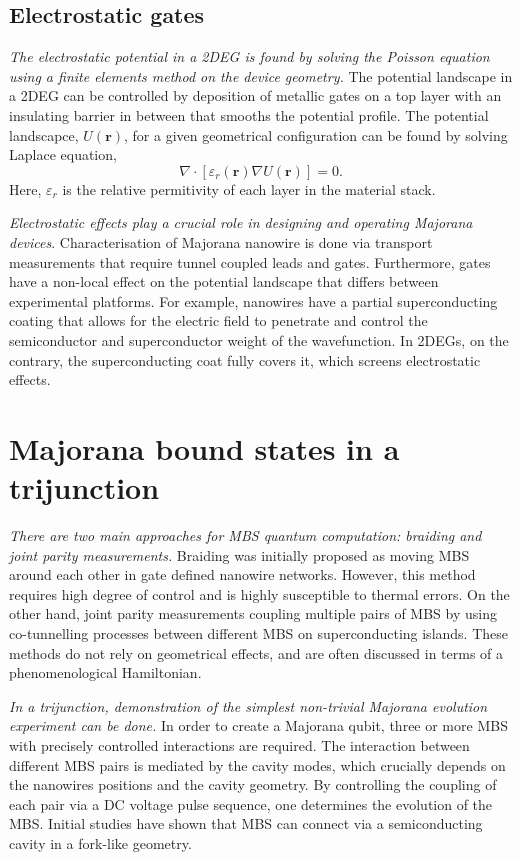 \subsection{Electrostatic gates}

\textit{The electrostatic potential in a 2DEG is found by solving the Poisson equation using a finite elements method on the device geometry.}
The potential landscape in a 2DEG can be controlled by deposition of metallic gates on a top layer with an insulating barrier in between that smooths the potential profile.
The potential landscapce, $U(\mathbf{r})$, for a given geometrical configuration can be found by solving Laplace equation, 
\begin{equation}
\nabla \cdot \left[ \varepsilon_r(\mathbf{r}) \nabla U(\mathbf{r}) \right] = 0.
\end{equation}
Here, $\varepsilon_r$ is the relative permitivity of each layer in the material stack.

\textit{Electrostatic effects play a crucial role in designing and operating Majorana devices}.
Characterisation of Majorana nanowire is done via transport measurements that require tunnel coupled leads and gates.
Furthermore, gates have a non-local effect on the potential landscape that differs between experimental platforms.
For example, nanowires have a partial superconducting coating that allows for the electric field to penetrate and control the semiconductor and superconductor weight of the wavefunction.
In 2DEGs, on the contrary, the superconducting coat fully covers it, which screens electrostatic effects.

\section{Majorana bound states in a trijunction}

\textit{There are two main approaches for MBS quantum computation: braiding and joint parity measurements.}
Braiding was initially proposed as moving MBS around each other in gate defined nanowire networks\cite{Alicea2011}. 
However, this method requires high degree of control and is highly susceptible to thermal errors\cite{Pedrocchi2015}.
On the other hand, joint parity measurements coupling multiple pairs of MBS\cite{Plugge2017} by using co-tunnelling processes between different MBS on superconducting islands.
These methods do not rely on geometrical effects, and are often discussed in terms of a phenomenological Hamiltonian.

\textit{In a trijunction, demonstration of the simplest non-trivial Majorana evolution experiment can be done.}
In order to create a Majorana qubit, three or more MBS with precisely controlled interactions are required.
The interaction between different MBS pairs is mediated by the cavity modes, which crucially depends on the nanowires positions and the cavity geometry.
By controlling the coupling of each pair via a DC voltage pulse sequence, one determines the evolution of the MBS.
Initial studies\cite{Hell2016} have shown that MBS can connect via a semiconducting cavity in a fork-like geometry.

